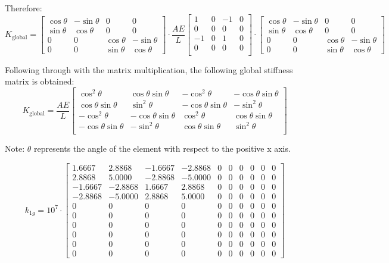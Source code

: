 \documentclass[8pt]{article}
\begin{document}
Therefore:
$$K_{\text{global}} = \begin{bmatrix}
    \cos\theta & -\sin\theta & 0 & 0 \\
    \sin\theta & \cos\theta & 0 & 0 \\
    0 & 0 & \cos\theta & -\sin\theta \\
    0 & 0 & \sin\theta & \cos\theta
    \end{bmatrix} \cdot \frac{AE}{L}
    \begin{bmatrix}
        1 & 0 & -1 & 0 \\
        0 & 0 & 0 & 0 \\
        -1 & 0 & 1 & 0 \\
        0 & 0 & 0 & 0 \\
    \end{bmatrix} \cdot \begin{bmatrix}
        \cos\theta & -\sin\theta & 0 & 0 \\
        \sin\theta & \cos\theta & 0 & 0 \\
        0 & 0 & \cos\theta & -\sin\theta \\
        0 & 0 & \sin\theta & \cos\theta \end{bmatrix}$$

Following through with the matrix multiplication, the following global stiffness matrix is obtained:
\[
K_{\text{global}} = \frac{AE}{L}
\begin{bmatrix}
\cos^2\theta & \cos\theta \sin\theta & -\cos^2\theta & -\cos\theta \sin\theta \\
\cos\theta \sin\theta & \sin^2\theta & -\cos\theta \sin\theta & -\sin^2\theta \\
-\cos^2\theta & -\cos\theta \sin\theta & \cos^2\theta & \cos\theta \sin\theta \\
-\cos\theta \sin\theta & -\sin^2\theta & \cos\theta \sin\theta & \sin^2\theta \\
\end{bmatrix}
\]

Note: $\theta$ represents the angle of the element with respect to the positive x axis. 

\[
k_{1g} = 10^7 \cdot 
\begin{bmatrix}
  1.6667 & 2.8868 & -1.6667 & -2.8868 & 0 & 0 & 0 & 0 & 0 & 0 \\
  2.8868 & 5.0000 & -2.8868 & -5.0000 & 0 & 0 & 0 & 0 & 0 & 0 \\
 -1.6667 & -2.8868 & 1.6667 & 2.8868 & 0 & 0 & 0 & 0 & 0 & 0 \\
 -2.8868 & -5.0000 & 2.8868 & 5.0000 & 0 & 0 & 0 & 0 & 0 & 0 \\
  0 & 0 & 0 & 0 & 0 & 0 & 0 & 0 & 0 & 0 \\
  0 & 0 & 0 & 0 & 0 & 0 & 0 & 0 & 0 & 0 \\
  0 & 0 & 0 & 0 & 0 & 0 & 0 & 0 & 0 & 0 \\
  0 & 0 & 0 & 0 & 0 & 0 & 0 & 0 & 0 & 0 \\
  0 & 0 & 0 & 0 & 0 & 0 & 0 & 0 & 0 & 0 \\
  0 & 0 & 0 & 0 & 0 & 0 & 0 & 0 & 0 & 0
\end{bmatrix}
\]
\end{document}
